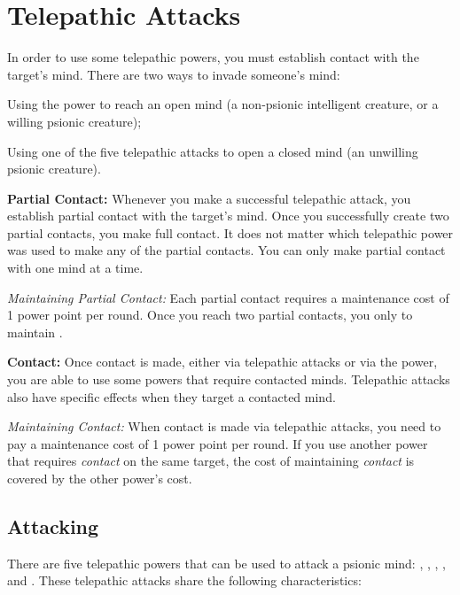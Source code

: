 \section{Telepathic Attacks}
In order to use some telepathic powers, you must establish contact with the target's mind. There are two ways to invade someone's mind:

\begin{itemize*}
	\item Using the  power to reach an open mind (a non-psionic intelligent creature, or a willing psionic creature);
	\item Using one of the five telepathic attacks to open a closed mind (an unwilling psionic creature).
\end{itemize*}

\textbf{Partial Contact:} Whenever you make a successful telepathic attack, you establish partial contact with the target's mind. Once you successfully create two partial contacts, you make full contact. It does not matter which telepathic power was used to make any of the partial contacts. You can only make partial contact with one mind at a time.

\textit{Maintaining Partial Contact:} Each partial contact requires a maintenance cost of 1 power point per round. Once you reach two partial contacts, you only to maintain . %

\textbf{Contact:} Once contact is made, either via telepathic attacks or via the  power, you are able to use some powers that require contacted minds. Telepathic attacks also have specific effects when they target a contacted mind.

\textit{Maintaining Contact:} When contact is made via telepathic attacks, you need to pay a maintenance cost of 1 power point per round. If you use another power that requires \emph{contact} on the same target, the cost of maintaining \emph{contact} is covered by the other power's cost.

\subsection{Attacking}
There are five telepathic powers that can be used to attack a psionic mind: , , , , and . These telepathic attacks share the following characteristics:

